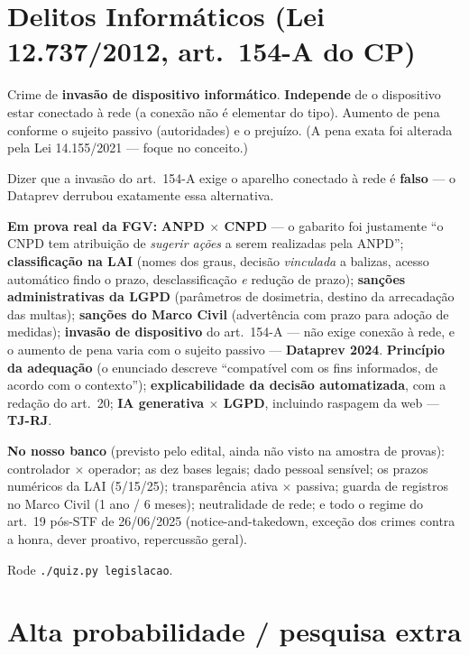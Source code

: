 \section{Delitos Informáticos (Lei 12.737/2012, art.\ 154-A do CP)}

Crime de \textbf{invasão de dispositivo informático}. \textbf{Independe} de
o dispositivo estar conectado à rede (a conexão não é elementar do tipo).
Aumento de pena conforme o sujeito passivo (autoridades) e o prejuízo. (A
pena exata foi alterada pela Lei 14.155/2021 --- foque no conceito.)

\begin{pegadinha}
Dizer que a invasão do art.\ 154-A exige o aparelho conectado à rede é
\textbf{falso} --- o Dataprev derrubou exatamente essa alternativa.
\end{pegadinha}

\begin{jacaiu}
\textbf{Em prova real da FGV:} \textbf{ANPD $\times$ CNPD} --- o gabarito foi
justamente ``o CNPD tem atribuição de \emph{sugerir ações} a serem
realizadas pela ANPD''; \textbf{classificação na LAI} (nomes dos graus,
decisão \emph{vinculada} a balizas, acesso automático findo o prazo,
desclassificação \emph{e} redução de prazo); \textbf{sanções administrativas
da LGPD} (parâmetros de dosimetria, destino da arrecadação das multas);
\textbf{sanções do Marco Civil} (advertência com prazo para adoção de
medidas); \textbf{invasão de dispositivo} do art.\ 154-A --- não exige
conexão à rede, e o aumento de pena varia com o sujeito passivo ---
\textbf{Dataprev 2024}. \textbf{Princípio da adequação} (o enunciado descreve
``compatível com os fins informados, de acordo com o contexto'');
\textbf{explicabilidade da decisão automatizada}, com a redação do art.\ 20;
\textbf{IA generativa $\times$ LGPD}, incluindo raspagem da web ---
\textbf{TJ-RJ}.

\textbf{No nosso banco} (previsto pelo edital, ainda não visto na amostra de
provas): controlador $\times$ operador; as dez bases legais; dado pessoal
sensível; os prazos numéricos da LAI (5/15/25); transparência ativa $\times$
passiva; guarda de registros no Marco Civil (1 ano / 6 meses); neutralidade
de rede; e todo o regime do art.\ 19 pós-STF de 26/06/2025
(notice-and-takedown, exceção dos crimes contra a honra, dever proativo,
repercussão geral).

Rode \texttt{./quiz.py legislacao}.
\end{jacaiu}

\section{Alta probabilidade / pesquisa extra}

